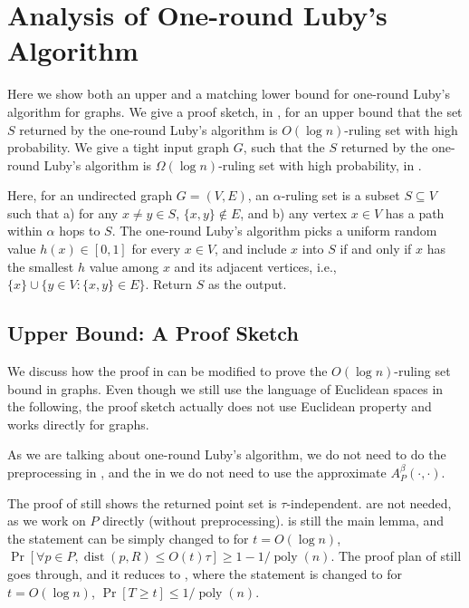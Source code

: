 \documentclass[11pt,letterpaper]{article}
\theoremstyle{plain}
\theoremstyle{definition}
\theoremstyle{remark}
\DeclareMathOperator{\poly}{poly}
\DeclareMathOperator{\dist}{dist}
\begin{document}
     \section{Analysis of One-round Luby's Algorithm}
\label{sec:one_round_luby}


Here we show both an upper and a matching lower bound for one-round Luby's algorithm for graphs.
We give a proof sketch, in , for an upper bound that the set $S$ returned by the one-round Luby's algorithm is $O(\log n)$-ruling set with high probability.
We give a tight input graph $G$, such that the $S$ returned by the one-round Luby's algorithm is $\Omega(\log n)$-ruling set with high probability, in .


Here, for an undirected graph $G = (V, E)$, 
an $\alpha$-ruling set is a subset $S \subseteq V$ such that a) for any $x \neq y \in S$, $\{x, y\} \notin E$, and b)
any vertex $x \in V$ has a path within $\alpha$ hops to $S$.
The one-round Luby's algorithm picks a uniform random value $h(x) \in [0, 1]$ for every $x \in V$,
and include $x$ into $S$ if and only if $x$ has the smallest $h$ value among $x$ and its adjacent vertices, i.e., $\{x\} \cup \{ y \in V : \{x, y \} \in E \}$.
Return $S$ as the output.


\subsection{Upper Bound: A Proof Sketch}
\label{sec:luby_graph_ub}
We discuss how the proof in  can be modified to prove the $O(\log n)$-ruling set bound in graphs.
Even though we still use the language of Euclidean spaces in the following,
the proof sketch actually does not use Euclidean property and works directly for graphs.

As we are talking about one-round Luby's algorithm, we do not need to do the preprocessing in ,
and the in  we do not need to use the approximate $A_P^\beta(\cdot, \cdot)$.

The proof of  still shows the returned point set is $\tau$-independent.
 are not needed, as we work on $P$ directly (without preprocessing).
 is still the main lemma,
and the statement can be simply changed to for $t = O(\log n)$,
$\Pr[\forall p \in P, \dist(p, R) \leq O(t) \tau ] \geq 1- 1 / \poly(n)$.
The proof plan of  still goes through,
and it reduces to ,
where the statement is changed to for $t = O(\log n)$,
$\Pr[T \geq t] \leq 1 / \poly(n)$.
\end{document}
